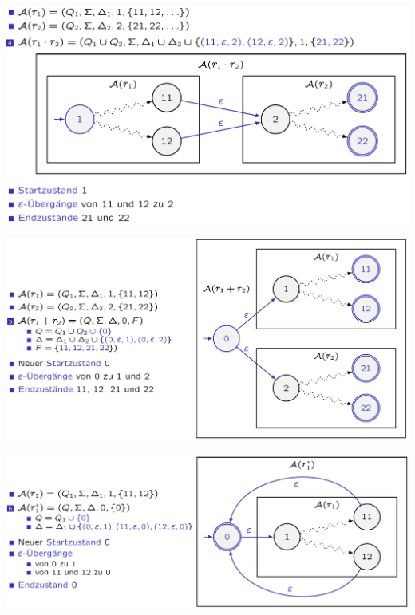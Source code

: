 \documentclass[12pt,a4paper]{article}
\begin{document}
	\begin{center}
			\includegraphics[width=\textwidth]{Bilder/KonkatenationNEA.png}
	\end{center}
	\begin{center}
			\includegraphics[width=\textwidth]{Bilder/VereinigungNEA.png}
	\end{center}

	\begin{center}
			\includegraphics[width=\textwidth]{Bilder/KleeneNEA.png}
	\end{center}

	\newpage
\end{document}
